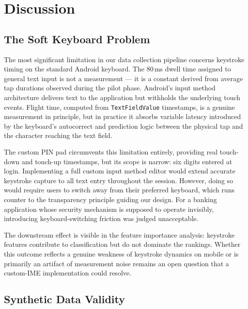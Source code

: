 \documentclass[conference]{IEEEtran}
\begin{document}
\section{Discussion}
\label{sec:discussion}

\subsection{The Soft Keyboard Problem}

The most significant limitation in our data collection pipeline concerns keystroke timing on the standard Android keyboard. The 80\,ms dwell time assigned to general text input is not a measurement --- it is a constant derived from average tap durations observed during the pilot phase. Android's input method architecture delivers text to the application but withholds the underlying touch events. Flight time, computed from \texttt{TextFieldValue} timestamps, is a genuine measurement in principle, but in practice it absorbs variable latency introduced by the keyboard's autocorrect and prediction logic between the physical tap and the character reaching the text field.

The custom PIN pad circumvents this limitation entirely, providing real touch-down and touch-up timestamps, but its scope is narrow: six digits entered at login. Implementing a full custom input method editor would extend accurate keystroke capture to all text entry throughout the session. However, doing so would require users to switch away from their preferred keyboard, which runs counter to the transparency principle guiding our design. For a banking application whose security mechanism is supposed to operate invisibly, introducing keyboard-switching friction was judged unacceptable.

The downstream effect is visible in the feature importance analysis: keystroke features contribute to classification but do not dominate the rankings. Whether this outcome reflects a genuine weakness of keystroke dynamics on mobile or is primarily an artifact of measurement noise remains an open question that a custom-IME implementation could resolve.

\subsection{Synthetic Data Validity}
\end{document}
